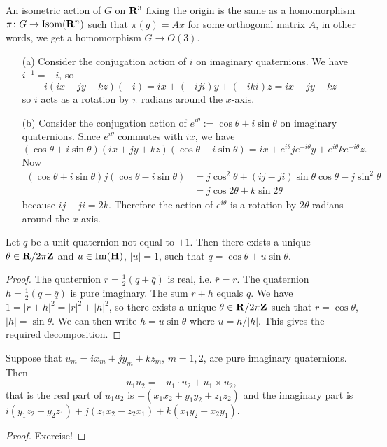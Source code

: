 \documentclass[12pt]{article}
\begin{document}
An isometric action of $G$ on $\mathbf{R}^3$ fixing the origin is the same as a homomorphism $\pi\colon G\to\operatorname{Isom}(\mathbf{R}^n)$ such that $\pi(g)=Ax$ for some orthogonal matrix $A$, in other words, we get a homomorphism $G\to O(3)$.

\begin{exm}
  \begin{enumerate}
    \item[(a)] Consider the conjugation action of $i$ on imaginary quaternions. We have $i^{-1}=-i$, so
      \[i(ix+jy+kz)(-i)=ix+(-iji)y+(-iki)z=ix-jy-kz\]
      so $i$ acts as a rotation by $\pi$ radians around the $x$-axis.
    \item[(b)] Consider the conjugation action of $e^{i\theta}:=\cos\theta+i\sin\theta$ on imaginary quaternions. Since $e^{i\theta}$ commutes with $ix$, we have
      \[(\cos\theta+i\sin\theta)(ix+jy+kz)(\cos\theta-i\sin\theta)=ix+e^{i\theta}je^{-i\theta}y+e^{i\theta}ke^{-i\theta}z.\]
      Now
      \begin{align*}
        (\cos\theta+i\sin\theta)j(\cos\theta-i\sin\theta)&=j\cos^2\theta+(ij-ji)\sin\theta\cos\theta-j\sin^2\theta\\
        &=j\cos 2\theta+k\sin 2\theta
      \end{align*}
      because $ij-ji=2k$. Therefore the action of $e^{i\theta}$ is a rotation by $2\theta$ radians around the $x$-axis.
  \end{enumerate}
\end{exm}

\begin{lma}
  Let $q$ be a unit quaternion not equal to $\pm 1$. Then there exists a unique $\theta\in\mathbf{R}/2\pi\mathbf{Z}$ and $u\in\operatorname{Im}(\mathbf{H})$, $|u|=1$, such that $q=\cos\theta+u\sin\theta$.
\end{lma}
\begin{proof}
  The quaternion $r=\frac{1}{2}(q+\bar{q})$ is real, i.e. $\bar{r}=r$. The quaternion $h=\frac{1}{2}(q-\bar{q})$ is pure imaginary. The sum $r+h$ equals $q$. We have $1=|r+h|^2=|r|^2+|h|^2$, so there exists a unique $\theta\in\mathbf{R}/2\pi\mathbf{Z}$ such that $r=\cos\theta$, $|h|=\sin\theta$. We can then write $h=u\sin\theta$ where $u=h/|h|$. This gives the required decomposition.
\end{proof}

\begin{lma}
  Suppose that $u_m=ix_m+jy_m+kz_m$, $m=1,2$, are pure imaginary quaternions. Then
  \[u_1u_2=-u_1\cdot u_2+u_1\times u_2,\]
  that is the real part of $u_1u_2$ is $-(x_1x_2+y_1y_2+z_1z_2)$ and the imaginary part is $i(y_1z_2-y_2z_1)+j(z_1x_2-z_2x_1)+k(x_1y_2-x_2y_1)$.
\end{lma}
\begin{proof}
  Exercise!
\end{proof}
\end{document}
